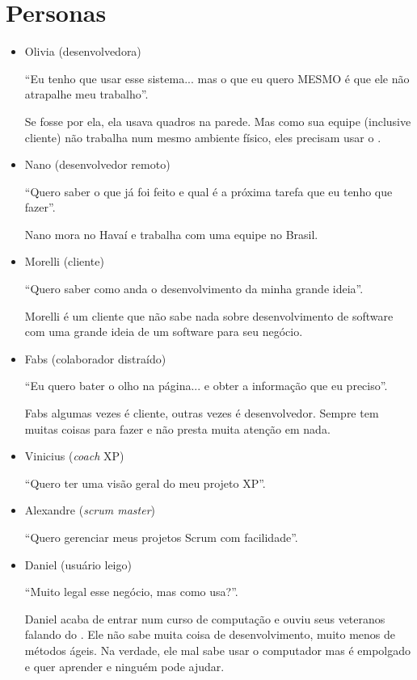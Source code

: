 \section{Personas}
\label{sec:personas}

\begin{itemize}
	\item{Olivia (desenvolvedora)
	
	``Eu tenho que usar esse sistema... mas o que eu quero MESMO é que ele não atrapalhe meu
	trabalho''.
	
	Se fosse por ela, ela usava quadros na parede. Mas como sua equipe (inclusive cliente) não trabalha num mesmo ambiente físico, eles precisam usar o \calopsita.}
	\item{Nano (desenvolvedor remoto)
	
	``Quero saber o que já foi feito e qual é a próxima tarefa que eu tenho que fazer''.
	
	Nano mora no Havaí e trabalha com uma equipe no Brasil.}
	\item{Morelli (cliente)
	
	``Quero saber como anda o desenvolvimento da minha grande ideia''. 
	
	Morelli é um cliente que não sabe nada sobre desenvolvimento de software com uma grande ideia de um software para seu negócio.}
	\item{Fabs (colaborador distraído)
	
	``Eu quero bater o olho na página... e obter a informação que eu preciso''.
	
	Fabs algumas vezes é cliente, outras vezes é desenvolvedor. Sempre tem muitas coisas para fazer e não presta muita atenção em nada.}
	\item{Vinicius (\textit{coach} XP)
	
	``Quero ter uma visão geral do meu projeto XP''.}
	\item{Alexandre (\textit{scrum master})
	
	``Quero gerenciar meus projetos Scrum com facilidade''.}
	\item{Daniel (usuário leigo)
	
	``Muito legal esse negócio, mas como usa?''. 
	
	Daniel acaba de entrar num curso de computação e ouviu seus veteranos falando do \calopsita{}. Ele não sabe muita coisa de desenvolvimento, muito menos de métodos ágeis. Na verdade, ele mal sabe usar o computador mas é empolgado e quer aprender e ninguém pode ajudar.}
\end{itemize}
